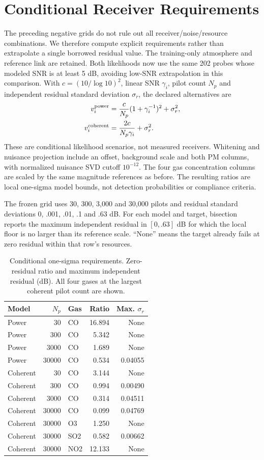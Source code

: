 \section{Conditional Receiver Requirements}
The preceding negative grids do not rule out all receiver/noise/resource combinations. We therefore compute explicit requirements rather than extrapolate a single borrowed residual value. The training-only atmosphere and reference link are retained. Both likelihoods now use the same 202 probes whose modeled SNR is at least 5 dB, avoiding low-SNR extrapolation in this comparison. With $c=(10/\log 10)^2$, linear SNR $\gamma_i$, pilot count $N_p$ and independent residual standard deviation $\sigma_r$, the declared alternatives are
\begin{align}
v_i^{\rm power}&=\frac{c}{N_p}(1+\gamma_i^{-1})^2+\sigma_r^2,\\
v_i^{\rm coherent}&=\frac{2c}{N_p\gamma_i}+\sigma_r^2.
\end{align}
These are conditional likelihood scenarios, not measured receivers. Whitening and nuisance projection include an offset, background scale and both PM columns, with normalized nuisance SVD cutoff $10^{-12}$. The four gas concentration columns are scaled by the same magnitude references as before. The resulting ratios are local one-sigma model bounds, not detection probabilities or compliance criteria.

The frozen grid uses 30, 300, 3,000 and 30,000 pilots and residual standard deviations 0, .001, .01, .1 and .63 dB. For each model and target, bisection reports the maximum independent residual in $[0,.63]$ dB for which the local floor is no larger than its reference scale. ``None'' means the target already fails at zero residual within that row's resources.
\begin{table}[t]\centering\footnotesize
\caption{Conditional one-sigma requirements. Zero-residual ratio and maximum independent residual (dB). All four gases at the largest coherent pilot count are shown.}
\setlength{\tabcolsep}{3pt}
\begin{tabular}{lrlrr}\toprule
Model & $N_p$ & Gas & Ratio & Max. $\sigma_r$\\\midrule
Power & 30 & CO & 16.894 & None\\
Power & 300 & CO & 5.342 & None\\
Power & 3000 & CO & 1.689 & None\\
Power & 30000 & CO & 0.534 & 0.04055\\
Coherent & 30 & CO & 3.144 & None\\
Coherent & 300 & CO & 0.994 & 0.00490\\
Coherent & 3000 & CO & 0.314 & 0.04511\\
Coherent & 30000 & CO & 0.099 & 0.04769\\
Coherent & 30000 & O3 & 1.250 & None\\
Coherent & 30000 & SO2 & 0.582 & 0.00662\\
Coherent & 30000 & NO2 & 12.133 & None\\
\bottomrule\end{tabular}
\end{table}


